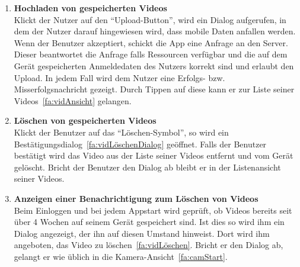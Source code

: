 \begin{enumerate}
\item \label{fa:vidHochladen}\textbf{Hochladen von gespeicherten Videos} \hfill \\
Klickt der Nutzer auf den ``Upload-Button'', wird ein Dialog aufgerufen, in dem der Nutzer darauf hingewiesen wird, dass mobile Daten anfallen werden. Wenn der Benutzer akzeptiert, schickt die \gls{App} eine Anfrage an den Server. Dieser beantwortet die Anfrage falls Ressourcen verfügbar und die auf dem Gerät gespeicherten Anmeldedaten des Nutzers korrekt sind und erlaubt den Upload. In jedem Fall wird dem Nutzer eine Erfolgs- bzw. Misserfolgsnachricht gezeigt. Durch Tippen auf diese kann er zur Liste seiner Videos~\eqref{fa:vidAnsicht} gelangen.

\item \label{fa:vidLöschen}\textbf{Löschen von gespeicherten Videos} \hfill \\
Klickt der Benutzer auf das ``Löschen-Symbol'', so wird ein Bestätigungsdialog~\eqref{fa:vidLöschenDialog} geöffnet. Falls der Benutzer bestätigt wird das Video aus der Liste seiner  Videos entfernt und vom Gerät gelöscht. Bricht der Benutzer den Dialog ab bleibt er in der Listenansicht seiner Videos.

\item \label{fa:vidLöschenDialog}\textbf{Anzeigen einer Benachrichtigung zum Löschen von Videos} \hfill \\
Beim Einloggen und bei jedem Appstart wird geprüft, ob  Videos bereits seit über 4 Wochen auf seinem Gerät gespeichert sind. Ist dies so wird ihm ein Dialog angezeigt, der ihn auf diesen Umstand hinweist. Dort wird ihm angeboten, das Video zu löschen~\eqref{fa:vidLöschen}. Bricht er den Dialog ab, gelangt er wie üblich in die Kamera-Ansicht~\eqref{fa:camStart}.


\end{enumerate}
